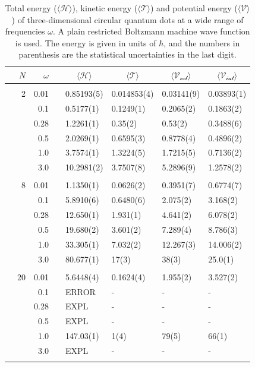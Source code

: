 \begin{table}
	\caption{Total energy ($\langle \mathcal{H}\rangle$), kinetic energy ($\langle\mathcal{T}\rangle$) and potential energy ($\langle \mathcal{V}\rangle$) of three-dimensional circular quantum dots at a wide range of frequencies $\omega$. A plain restricted Boltzmann machine wave function is used. The energy is given in units of $\hbar$, and the numbers in parenthesis are the statistical uncertainties in the last digit.}
	\label{tab:splitfrequencyQDRBM3D}
	\begin{tabularx}{\textwidth}{R{1.5cm}rrcR{2.3cm}R{2.3cm}R{2.3cm}R{2.3cm}} \hline\hline
		& & $\omega$ &&  &  &  &  \\ \hline \\
		&2 & 0.01 && 0.85193(5) & 0.014853(4) & 0.03141(9) & 0.03893(1) \\
		&& 0.1 && 0.5177(1) & 0.1249(1) & 0.2065(2) & 0.1863(2) \\
		&& 0.28 && 1.2261(1) & 0.35(2) & 0.53(2) & 0.3488(6) \\
		&& 0.5 && 2.0269(1) & 0.6595(3) & 0.8778(4) & 0.4896(2) \\
		&& 1.0 && 3.7574(1) & 1.3224(5) & 1.7215(5) & 0.7136(2) \\
		&& 3.0 && 10.2981(2) & 3.7507(8) & 5.2896(9) & 1.2578(2) \\ \hdashline \\
		
		&8 & 0.01 && 1.1350(1) & 0.0626(2) & 0.3951(7) & 0.6774(7) \\
		&& 0.1 && 5.8910(6) & 0.6480(6) & 2.075(2) & 3.168(2) \\
		&& 0.28 && 12.650(1) & 1.931(1) & 4.641(2) & 6.078(2) \\
		&& 0.5 && 19.680(2) & 3.601(2) & 7.289(4) & 8.786(3) \\
		&& 1.0 && 33.305(1) & 7.032(2) & 12.267(3) & 14.006(2) \\
		&& 3.0 && 80.677(1) & 17(3) & 38(3) & 25.0(1) \\ \hdashline \\
		
		&20 & 0.01 && 5.6448(4) & 0.1624(4) & 1.955(2) & 3.527(2) \\
		&& 0.1 && ERROR & - & - & - \\
		&& 0.28 && EXPL & - & - & - \\
		&& 0.5 && EXPL & - & - & - \\
		&& 1.0 && 147.03(1) & 1(4) & 79(5) & 66(1) \\
		&& 3.0 && EXPL & - & - & - \\ \hdashline \\
		

\end{tabularx}
\end{table}
